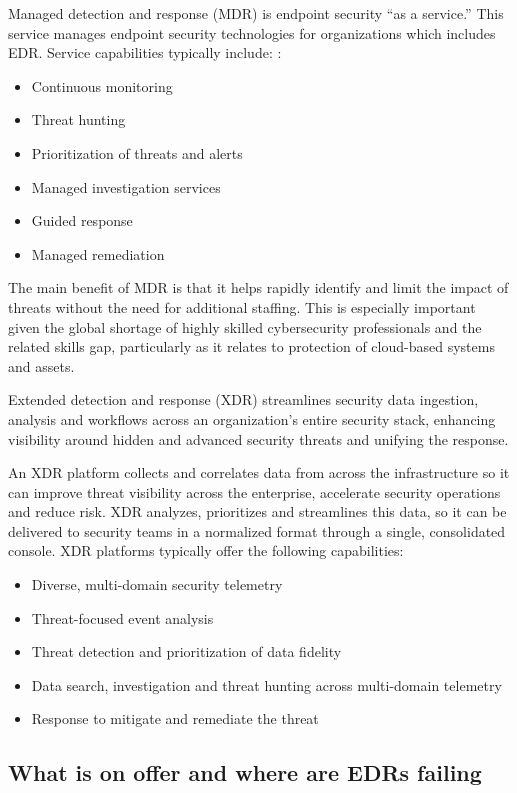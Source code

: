 \documentclass{article}
\begin{document}
Managed detection and response (MDR) is endpoint security “as a service.” This  service manages endpoint security technologies for organizations which includes EDR. Service capabilities typically include: :

\begin{itemize}
\item	Continuous monitoring
\item	Threat hunting
\item	Prioritization of threats and alerts
\item	Managed investigation services
\item	Guided response
\item	Managed remediation
\end{itemize}

The main benefit of MDR is that it helps rapidly identify and limit the impact of threats without the need for additional staffing. This is especially important given the global shortage of highly skilled cybersecurity professionals and the related skills gap, particularly as it relates to protection of cloud-based systems and assets.

Extended detection and response (XDR) streamlines security data ingestion, analysis and workflows across an organization’s entire security stack, enhancing visibility around hidden and advanced security threats and unifying the response.

An XDR platform collects and correlates data from across the infrastructure so it can improve threat visibility across the enterprise, accelerate security operations and reduce risk. XDR analyzes, prioritizes and streamlines this data, so it can be delivered to security teams in a normalized format through a single, consolidated console.
XDR platforms typically offer the following capabilities:

\begin{itemize}
\item	Diverse, multi-domain security telemetry
\item	Threat-focused event analysis
\item	Threat detection and prioritization of data fidelity
\item	Data search, investigation and threat hunting across multi-domain telemetry
\item	Response to mitigate and remediate the threat
\end{itemize}

\subsection{What is on offer and where are EDRs failing}
\end{document}
